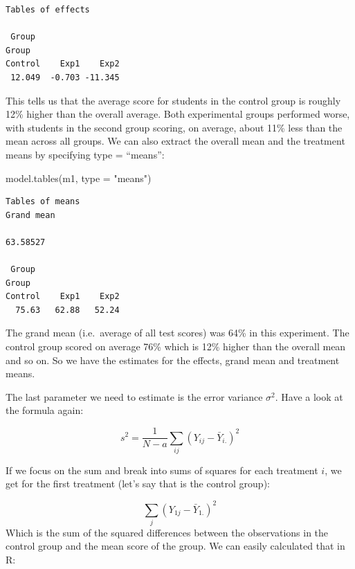 \documentclass[
  letterpaper,
  DIV=11,
  numbers=noendperiod,
  oneside]{scrreprt}
\newenvironment{Shaded}{\begin{snugshade}}{\end{snugshade}}
\newcommand{\AttributeTok}[1]{\textcolor[rgb]{0.40,0.45,0.13}{#1}}
\newcommand{\FunctionTok}[1]{\textcolor[rgb]{0.28,0.35,0.67}{#1}}
\newcommand{\NormalTok}[1]{\textcolor[rgb]{0.00,0.23,0.31}{#1}}
\newcommand{\StringTok}[1]{\textcolor[rgb]{0.13,0.47,0.30}{#1}}
\begin{document}
\begin{verbatim}
Tables of effects

 Group 
Group
Control    Exp1    Exp2 
 12.049  -0.703 -11.345 
\end{verbatim}

This tells us that the average score for students in the control group
is roughly 12\% higher than the overall average. Both experimental groups performed worse, with
students in the second group scoring, on average, about 11\% less than
the mean across all groups. We can also extract the overall mean and the
treatment means by specifying type = ``means'':

\begin{Shaded}
\begin{Highlighting}[]
\FunctionTok{model.tables}\NormalTok{(m1, }\AttributeTok{type =} \StringTok{"means"}\NormalTok{)}
\end{Highlighting}
\end{Shaded}

\begin{verbatim}
Tables of means
Grand mean
         
63.58527 

 Group 
Group
Control    Exp1    Exp2 
  75.63   62.88   52.24 
\end{verbatim}

The grand mean (i.e.~average of all test scores) was 64\% in this
experiment. The control group scored on average 76\% which is 12\%
higher than the overall mean and so on. So we have the estimates for the
effects, grand mean and treatment means.

The last parameter we need to estimate is the error variance
\(\sigma^2\). Have a look at the formula again:

\[ s^2 = \frac{1}{N-a}\sum_{ij}(Y_{ij} - \bar{Y}_{i.})^2 \]

If we focus on the sum and break into sums of squares for each treatment
\(i\), we get for the first treatment (let's say that is the control
group):

\[ \sum_{j}(Y_{1j} - \bar{Y}_{1.})^2 \] Which is the sum of the squared
differences between the observations in the control group and the mean
score of the group. We can easily calculated that in R:
\end{document}
